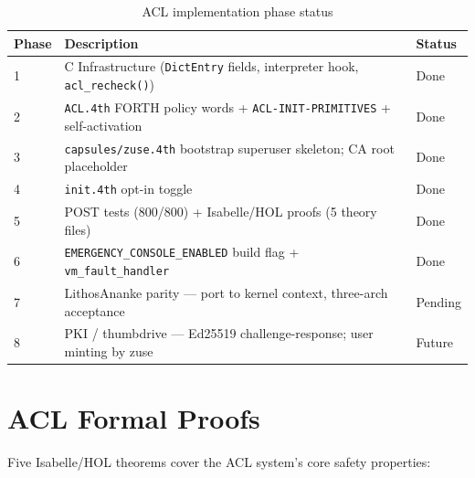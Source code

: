 \begin{table}[ht]
  \centering
  \caption{ACL implementation phase status}
  \label{tab:acl-phases}
  \begin{tabular}{lll}
    \toprule
    Phase & Description & Status \\
    \midrule
    1 & C Infrastructure (\texttt{DictEntry} fields, interpreter hook, \texttt{acl\_recheck()}) & Done \\
    2 & \texttt{ACL.4th} FORTH policy words + \texttt{ACL-INIT-PRIMITIVES} + self-activation & Done \\
    3 & \texttt{capsules/zuse.4th} bootstrap superuser skeleton; CA root placeholder & Done \\
    4 & \texttt{init.4th} opt-in toggle & Done \\
    5 & POST tests (800/800) + Isabelle/HOL proofs (5 theory files) & Done \\
    6 & \texttt{EMERGENCY\_CONSOLE\_ENABLED} build flag + \texttt{vm\_fault\_handler} & Done \\
    7 & LithosAnanke parity — port to kernel context, three-arch acceptance & Pending \\
    8 & PKI / thumbdrive — Ed25519 challenge-response; user minting by zuse & Future \\
    \bottomrule
  \end{tabular}
\end{table}

\section{ACL Formal Proofs}
\label{vol1:sec:acl:proofs}


Five Isabelle/HOL theorems cover the ACL system's core safety properties:

